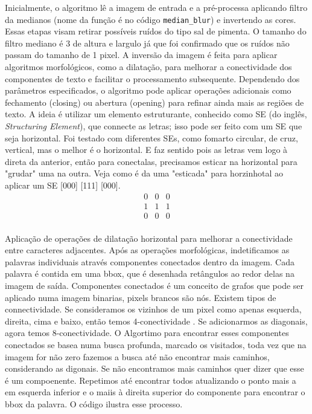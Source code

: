 \documentclass[english, 
               brazil, 
               bsc] %
               {dcomp-abntex2}
\begin{document}
Inicialmente, o algoritmo lê a imagem de entrada e a pré-processa aplicando filtro da medianos (nome da função é no código \texttt{median\_blur}) e invertendo as cores. Essas etapas visam retirar possíveis ruídos do tipo sal de pimenta. O tamanho do filtro mediano é 3 de altura e largulo já que foi confirmado que os ruídos não passam do tamanho de 1 pixel. A inversão da imagem é feita para aplicar algoritmos morfológicos, como a dilatação, para melhorar a conectividade dos componentes de texto e facilitar o processamento subsequente. Dependendo dos parâmetros especificados, o algoritmo pode aplicar operações adicionais como fechamento (closing) ou abertura (opening) para refinar ainda mais as regiões de texto. A ideia é utilizar um elemento estruturante, conhecido como SE (do inglês, \textit{Structuring Element}), que connecte as letras; isso pode ser feito com um SE que seja horizontal. Foi testado com diferentes SEs, como fomarto circular, de cruz, vertical, mas o melhor é o horizontal. E faz sentido pois as letras vem logo à direta da anterior, então para conectalas, precisamos esticar na horizontal para "grudar" uma na outra. Veja como é da uma "esticada" para horzinhotal ao aplicar um SE [000] [111] [000].
\[
\begin{matrix}
0 & 0 & 0 \\
1 & 1 & 1 \\
0 & 0 & 0 \\
\end{matrix}
\]



Aplicação de operações de dilatação horizontal para melhorar a conectividade entre caracteres adjacentes.
Após as operações morfológicas, indetificamos as palavras individuais através componentes conectados dentro da imagem. Cada palavra é contida em uma bbox, que é desenhada retângulos ao redor delas na imagem de saída. Componentes conectados  é um conceito de grafos que pode ser aplicado numa imagem binarias, pixels brancos são nós. Existem tipos de connectividade. Se consideramos os vizinhos de um pixel como apenas esquerda, direita, cima e baixo, então temos 4-conectividade \cite[2.5.2 Adjacency, Connectivity, Regions, and Boundaries]{gonzalez2008digital}. Se adicionarmos as diagonais, agora temos 8-conectividade. O Algortimo para encontrar esses componentes conectados se basea numa busca profunda, marcado os visitados, toda vez que na imagem for não zero fazemos a busca até não encontrar mais caminhos, considerando as digonais. Se não encontramos mais caminhos quer dizer que esse é um compoenente. Repetimos até encontrar todos atualizando o ponto mais a em esquerda inferior e o maiis à direita superior do componente para encontrar o bbox da palavra. O código ilustra esse processo.
\end{document}
